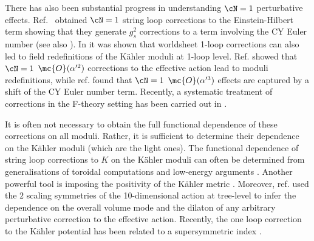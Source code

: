 There has also been substantial progress in understanding  $\cN=1$ perturbative effects. Ref.~\cite{Berg:2014ama, Haack:2015pbv,Haack:2018ufg}  obtained  $\cN=1$ string loop corrections to the Einstein-Hilbert term showing that they generate $g_s^2$ corrections to a term involving the CY Euler number (see also \cite{Antoniadis:2018hqy}).  In \cite{Conlon:2009xf,Conlon:2009kt} it was shown that worldsheet 1-loop corrections can also led to field redefinitions of the K\"ahler moduli at 1-loop level. Ref. \cite{Grimm:2013gma} showed that $\cN=1$ $\mc{O}(\alpha'^2)$ corrections to the effective action  lead to moduli redefinitions, while ref. \cite{Minasian:2015bxa} found that $\cN=1$ $\mc{O}(\alpha'^3)$ effects are captured by a shift of the CY Euler number term.   Recently, a systematic treatment of corrections in the F-theory setting has been carried out in \cite{Cicoli:2021rub}.

It is often not necessary to obtain the full functional dependence of these corrections on all moduli. Rather, it is sufficient to determine their dependence on the K\"ahler moduli (which are the light ones).  The functional dependence of string loop corrections to $K$ on the K\"ahler moduli can often  be determined from generalisations of toroidal computations and low-energy arguments \cite{Cicoli:2007xp, Burgess:2010sy}. Another powerful tool is imposing the positivity of the K\"ahler metric \cite{Conlon:2006gv}. Moreover, ref. \cite{Burgess:2020qsc} used the $2$ scaling symmetries of the 10-dimensional action at tree-level to infer the dependence on the overall volume mode and the dilaton of any arbitrary perturbative correction to the effective action. Recently, the one loop correction to the K\"ahler potential has
been related to a supersymmetric index \cite{Kim:2023sfs}.

